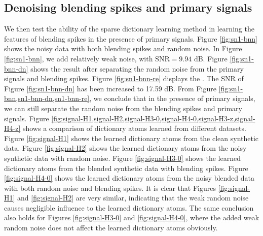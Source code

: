 \subsection{Denoising blending spikes and primary signals}
We then test the ability of the sparse dictionary learning method in learning the features of blending spikes in the presence of primary signals.   Figure \ref{fig:sn1-bnn} shows the noisy data with both blending spikes and random noise. In Figure \ref{fig:sn1-bnn}, we add relatively weak noise, with $\text{SNR}=9.94$ dB. Figure \ref{fig:sn1-bnn-dn} shows the result after separating the random noise from the primary signals and blending spikes. Figure \ref{fig:sn1-bnn-re} displays the . The SNR of Figure \ref{fig:sn1-bnn-dn} has been increased to 17.59 dB.  From Figure \ref{fig:sn1-bnn,sn1-bnn-dn,sn1-bnn-re}, we conclude that in the presence of primary signals, we can still separate the random noise from the blending spikes and primary signals. Figure \ref{fig:signal-H1,signal-H2,signal-H3-0,signal-H4-0,signal-H3-z,signal-H4-z} shows a comparison of dictionary atoms learned from different datasets. Figure \ref{fig:signal-H1} shows the learned dictionary atoms from the clean synthetic data. Figure \ref{fig:signal-H2} shows the learned dictionary atoms from the noisy synthetic data with random noise. Figure \ref{fig:signal-H3-0} shows the learned dictionary atoms from the blended synthetic data with blending spikes. Figure \ref{fig:signal-H4-0} shows the learned dictionary atoms from the noisy blended data with both random noise and blending spikes. It is clear that Figures \ref{fig:signal-H1} and \ref{fig:signal-H2} are very similar, indicating that the weak random noise causes negligible influence to the learned dictionary atoms. The same conclusion also holds for Figures \ref{fig:signal-H3-0} and \ref{fig:signal-H4-0}, where the added weak random noise does not affect the learned dictionary atoms obviously. 

